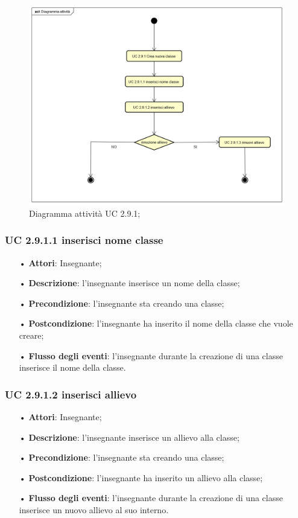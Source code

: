 \begin{figure}[H]
	\centering
	\includegraphics[width=17cm]{img/Diagramma_attivita_crea_classe.png} 
	\caption{Diagramma attività UC 2.9.1;}
\end{figure}


\subsubsection{UC 2.9.1.1 inserisci nome classe}
\begin{itemize}
	\item[•] \textbf{Attori}: Insegnante;
	\item[•] \textbf{Descrizione}: l'insegnante inserisce un nome della classe;
	\item[•] \textbf{Precondizione}: l'insegnante sta creando una classe;
	\item[•] \textbf{Postcondizione}: l'insegnante ha inserito il nome della classe che vuole creare;
	\item[•] \textbf{Flusso degli eventi}: l'insegnante durante la creazione di una classe inserisce il nome della classe.
\end{itemize}

\subsubsection{UC 2.9.1.2 inserisci allievo}
\begin{itemize}
	\item[•] \textbf{Attori}: Insegnante;
	\item[•] \textbf{Descrizione}: l'insegnante inserisce un allievo alla classe;
	\item[•] \textbf{Precondizione}: l'insegnante sta creando una classe;
	\item[•] \textbf{Postcondizione}: l'insegnante ha inserito un allievo alla classe;
	\item[•] \textbf{Flusso degli eventi}: l'insegnante durante la creazione di una classe inserisce un nuovo allievo al suo interno.
\end{itemize}

